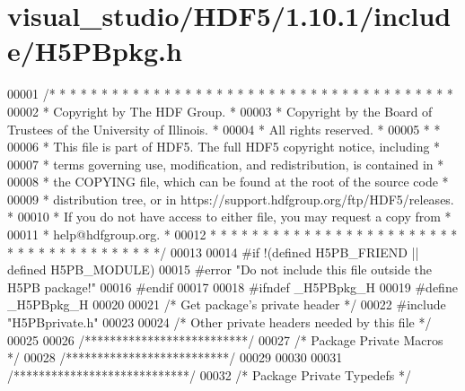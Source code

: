 \hypertarget{visual__studio_2_h_d_f5_21_810_81_2include_2_h5_p_bpkg_8h_source}{}\section{visual\+\_\+studio/\+H\+D\+F5/1.10.1/include/\+H5\+P\+Bpkg.h}
\label{visual__studio_2_h_d_f5_21_810_81_2include_2_h5_p_bpkg_8h_source}

\begin{DoxyCode}
00001 \textcolor{comment}{/* * * * * * * * * * * * * * * * * * * * * * * * * * * * * * * * * * * * * * *}
00002 \textcolor{comment}{ * Copyright by The HDF Group.                                               *}
00003 \textcolor{comment}{ * Copyright by the Board of Trustees of the University of Illinois.         *}
00004 \textcolor{comment}{ * All rights reserved.                                                      *}
00005 \textcolor{comment}{ *                                                                           *}
00006 \textcolor{comment}{ * This file is part of HDF5.  The full HDF5 copyright notice, including     *}
00007 \textcolor{comment}{ * terms governing use, modification, and redistribution, is contained in    *}
00008 \textcolor{comment}{ * the COPYING file, which can be found at the root of the source code       *}
00009 \textcolor{comment}{ * distribution tree, or in https://support.hdfgroup.org/ftp/HDF5/releases.  *}
00010 \textcolor{comment}{ * If you do not have access to either file, you may request a copy from     *}
00011 \textcolor{comment}{ * help@hdfgroup.org.                                                        *}
00012 \textcolor{comment}{ * * * * * * * * * * * * * * * * * * * * * * * * * * * * * * * * * * * * * * */}
00013 
00014 \textcolor{preprocessor}{#if !(defined H5PB\_FRIEND || defined H5PB\_MODULE)}
00015 \textcolor{preprocessor}{#error "Do not include this file outside the H5PB package!"}
00016 \textcolor{preprocessor}{#endif}
00017 
00018 \textcolor{preprocessor}{#ifndef \_H5PBpkg\_H}
00019 \textcolor{preprocessor}{#define \_H5PBpkg\_H}
00020 
00021 \textcolor{comment}{/* Get package's private header */}
00022 \textcolor{preprocessor}{#include "H5PBprivate.h"}
00023 
00024 \textcolor{comment}{/* Other private headers needed by this file */}
00025 
00026 \textcolor{comment}{/**************************/}
00027 \textcolor{comment}{/* Package Private Macros */}
00028 \textcolor{comment}{/**************************/}
00029 
00030 
00031 \textcolor{comment}{/****************************/}
00032 \textcolor{comment}{/* Package Private Typedefs */}

\end{DoxyCode}
